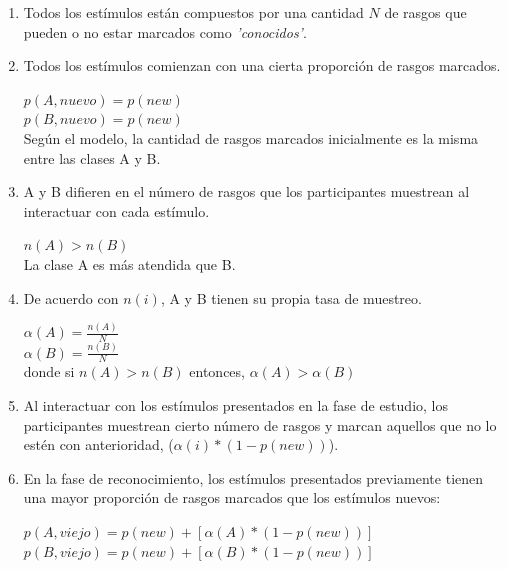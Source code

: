 \begin{enumerate}
\item Todos los estímulos están compuestos por una cantidad $N$ de rasgos que pueden o no estar marcados como \textit{'conocidos'}.\\

\item Todos los estímulos comienzan con una cierta proporción de rasgos marcados.\\
\begin{center}
$p(A,nuevo) = p(new)$\\
$p(B,nuevo) = p(new)$\\
Según el modelo, la cantidad de rasgos marcados inicialmente es la misma entre las clases A y B.\\
\end{center}

\item A y B difieren en el número de rasgos que los participantes muestrean al interactuar con cada estímulo.\\
\begin{center}
$n(A) > n(B)$\\
La clase A es más atendida que B.\\
\end{center}

\item De acuerdo con $n(i)$, A y B tienen su propia tasa de muestreo.\\
\begin{center}
$\alpha(A) = \frac{n(A)}{N}$\\
$\alpha(B) = \frac{n(B)}{N}$\\
donde si $n(A) > n(B)$ entonces, $\alpha(A) > \alpha(B)$\
\end{center}

\item Al interactuar con los estímulos presentados en la fase de estudio, los participantes muestrean cierto número de rasgos y marcan aquellos que no lo estén con anterioridad, ($\alpha(i)*(1-p(new))$).\\

\item En la fase de reconocimiento, los estímulos presentados previamente tienen una mayor proporción de rasgos marcados que los estímulos nuevos:\\
\begin{center}
$p(A,viejo) = p(new) + [\alpha(A)*(1-p(new))]$\\
$p(B,viejo) = p (new) + [\alpha(B)*(1-p(new))]$\\
\end{center}
\end{enumerate}

